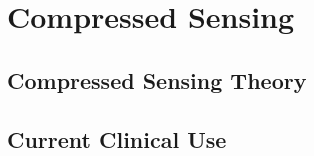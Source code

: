     \section{Compressed Sensing}
        
        \subsection{Compressed Sensing Theory}
        
        \subsection{Current Clinical Use}
        
        \subsection{}
